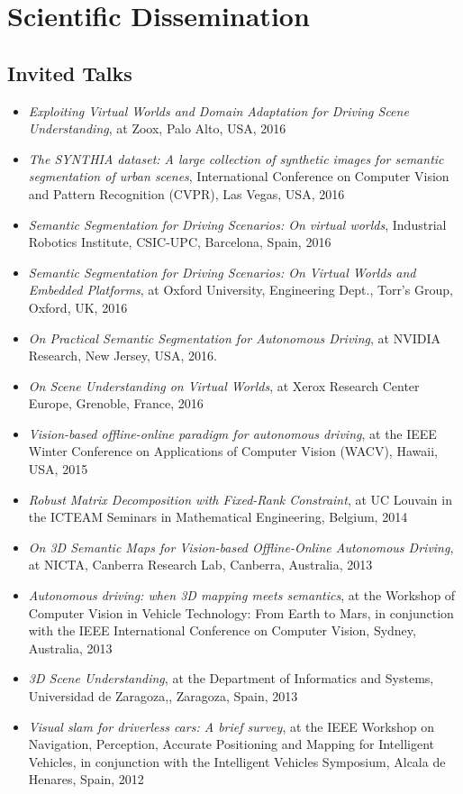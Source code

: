 \section{Scientific Dissemination}

\subsection{Invited Talks}
\begin{itemize}
\item  \textit{Exploiting Virtual Worlds and Domain Adaptation for Driving Scene Understanding}, at Zoox, Palo Alto, USA, 2016
\item  \textit{The {SYNTHIA} dataset: A large collection of synthetic images for
  semantic segmentation of urban scenes}, International Conference on Computer Vision and Pattern Recognition (CVPR), Las Vegas, USA, 2016
\item  \textit{Semantic Segmentation for Driving Scenarios: On virtual worlds}, Industrial Robotics Institute, CSIC-UPC, Barcelona, Spain, 2016
\item  \textit{Semantic Segmentation for Driving Scenarios: On Virtual Worlds and Embedded Platforms}, at Oxford University, Engineering Dept., Torr’s Group, Oxford, UK, 2016
\item  \textit{On Practical Semantic Segmentation for Autonomous Driving}, at NVIDIA Research, New Jersey, USA, 2016.

\item \textit{On Scene Understanding on Virtual Worlds}, at Xerox Research Center Europe, Grenoble, France, 2016

\item \textit{Vision-based offline-online paradigm for autonomous driving}, at the IEEE Winter Conference on Applications of Computer Vision (WACV), Hawaii, USA, 2015

\item \textit{Robust Matrix Decomposition with Fixed-Rank Constraint}, at UC Louvain in the ICTEAM Seminars in Mathematical Engineering, Belgium, 2014

\item \textit{On 3D Semantic Maps for Vision-based Offline-Online Autonomous Driving}, at NICTA, Canberra Research Lab, Canberra, Australia, 2013

\item \textit{Autonomous driving: when 3D mapping meets semantics}, at the Workshop of Computer Vision in Vehicle Technology: From Earth to Mars, in conjunction with the IEEE International Conference on Computer Vision, Sydney, Australia, 2013

\item \textit{3D Scene Understanding}, at the Department of Informatics and Systems, Universidad de Zaragoza,, Zaragoza, Spain, 2013

\item \textit{Visual slam for driverless cars: A brief survey}, at the IEEE Workshop on Navigation, Perception, Accurate Positioning and Mapping for Intelligent Vehicles, in conjunction with the Intelligent Vehicles Symposium, Alcala de Henares, Spain, 2012
\end{itemize}

